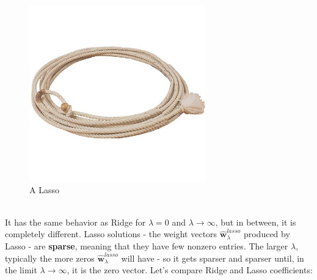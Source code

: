 \documentclass[11pt]{article}
\newcommand{\V}[1]{\mathbf{#1}}
\begin{document}
\begin{figure}[H]
      \centering
      \includegraphics[width=3in]{lasso_rope.jpg}
      \caption{A Lasso}
    \end{figure}
~\\
    It has the same behavior as Ridge for $\lambda=0$ and $\lambda\to\infty$,
    but in between, it is completely different. Lasso solutions - the weight
    vectors $\hat{\V{w}}_\lambda^{lasso}$ produced by Lasso -  are {\bf
    sparse}, meaning that they have few nonzero entries. 
    The larger $\lambda$, typically the more zeros $\hat{\V{w}}_\lambda^{lasso}$
    will have - so it gets sparser and sparser until, in the limit
    $\lambda\to\infty$, it is the zero vector. 
    Let's compare Ridge and Lasso coefficients:
    
\end{document}
